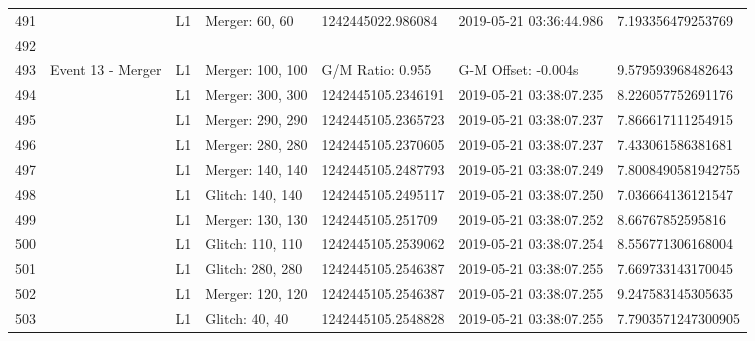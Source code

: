 \begin{longtable}{lllllll}
491  &                                                    &       L1 &    Merger: 60, 60 &   1242445022.986084 &  2019-05-21 03:36:44.986 &   7.193356479253769 \\
492  &                                                    &          &                   &                     &                          &                     \\
493  &                                  Event 13 - Merger &       L1 &  Merger: 100, 100 &    G/M Ratio: 0.955 &      G-M Offset: -0.004s &   9.579593968482643 \\
494  &                                                    &       L1 &  Merger: 300, 300 &  1242445105.2346191 &  2019-05-21 03:38:07.235 &   8.226057752691176 \\
495  &                                                    &       L1 &  Merger: 290, 290 &  1242445105.2365723 &  2019-05-21 03:38:07.237 &   7.866617111254915 \\
496  &                                                    &       L1 &  Merger: 280, 280 &  1242445105.2370605 &  2019-05-21 03:38:07.237 &   7.433061586381681 \\
497  &                                                    &       L1 &  Merger: 140, 140 &  1242445105.2487793 &  2019-05-21 03:38:07.249 &  7.8008490581942755 \\
498  &                                                    &       L1 &  Glitch: 140, 140 &  1242445105.2495117 &  2019-05-21 03:38:07.250 &   7.036664136121547 \\
499  &                                                    &       L1 &  Merger: 130, 130 &   1242445105.251709 &  2019-05-21 03:38:07.252 &    8.66767852595816 \\
500  &                                                    &       L1 &  Glitch: 110, 110 &  1242445105.2539062 &  2019-05-21 03:38:07.254 &   8.556771306168004 \\
501  &                                                    &       L1 &  Glitch: 280, 280 &  1242445105.2546387 &  2019-05-21 03:38:07.255 &   7.669733143170045 \\
502  &                                                    &       L1 &  Merger: 120, 120 &  1242445105.2546387 &  2019-05-21 03:38:07.255 &   9.247583145305635 \\
503  &                                                    &       L1 &    Glitch: 40, 40 &  1242445105.2548828 &  2019-05-21 03:38:07.255 &  7.7903571247300905 \\

\end{longtable}
